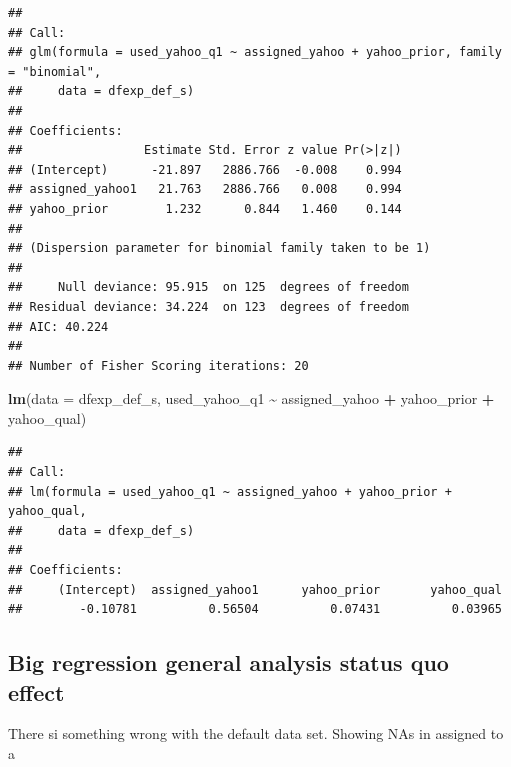 \documentclass[
  11pt,
]{article}
\newenvironment{Shaded}{\begin{snugshade}}{\end{snugshade}}
\newcommand{\AttributeTok}[1]{\textcolor[rgb]{0.13,0.29,0.53}{#1}}
\newcommand{\FunctionTok}[1]{\textcolor[rgb]{0.13,0.29,0.53}{\textbf{#1}}}
\newcommand{\NormalTok}[1]{#1}
\newcommand{\SpecialCharTok}[1]{\textcolor[rgb]{0.81,0.36,0.00}{\textbf{#1}}}
\begin{document}
\begin{verbatim}
## 
## Call:
## glm(formula = used_yahoo_q1 ~ assigned_yahoo + yahoo_prior, family = "binomial", 
##     data = dfexp_def_s)
## 
## Coefficients:
##                 Estimate Std. Error z value Pr(>|z|)
## (Intercept)      -21.897   2886.766  -0.008    0.994
## assigned_yahoo1   21.763   2886.766   0.008    0.994
## yahoo_prior        1.232      0.844   1.460    0.144
## 
## (Dispersion parameter for binomial family taken to be 1)
## 
##     Null deviance: 95.915  on 125  degrees of freedom
## Residual deviance: 34.224  on 123  degrees of freedom
## AIC: 40.224
## 
## Number of Fisher Scoring iterations: 20
\end{verbatim}

\begin{Shaded}
\begin{Highlighting}[]
\FunctionTok{lm}\NormalTok{(}\AttributeTok{data =}\NormalTok{ dfexp\_def\_s, used\_yahoo\_q1 }\SpecialCharTok{\textasciitilde{}}\NormalTok{ assigned\_yahoo }\SpecialCharTok{+}\NormalTok{ yahoo\_prior }\SpecialCharTok{+}\NormalTok{ yahoo\_qual)}
\end{Highlighting}
\end{Shaded}

\begin{verbatim}
## 
## Call:
## lm(formula = used_yahoo_q1 ~ assigned_yahoo + yahoo_prior + yahoo_qual, 
##     data = dfexp_def_s)
## 
## Coefficients:
##     (Intercept)  assigned_yahoo1      yahoo_prior       yahoo_qual  
##        -0.10781          0.56504          0.07431          0.03965
\end{verbatim}

\hypertarget{big-regression-general-analysis-status-quo-effect}{%
\subsection{Big regression general analysis status quo effect}\label{big-regression-general-analysis-status-quo-effect}}

There si something wrong with the default data set. Showing NAs in assigned to a
\end{document}

